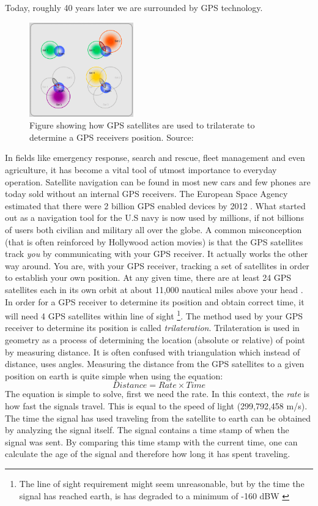 \documentclass[12pt,english,a4paper]{article}
\begin{document}
Today, roughly 40 years later we are surrounded by GPS technology.
\begin{figure}
  \centering
  \includegraphics[width=0.40\textwidth]{trilaterate.jpg}
  \caption[GPS trilaterate figure]
   {Figure showing how GPS satellites are used to trilaterate to determine a GPS receivers position. Source: \cite{GISTRILATERATE}}
\end{figure}
In fields like emergency response, search and rescue, fleet management and even agriculture, it has become a vital tool of utmost importance to everyday operation. Satellite navigation can be found in most new cars and few phones are today sold without an internal GPS receivers. The European Space Agency estimated that there were 2 billion GPS enabled devices by 2012 \cite{ESA}. What started out as a navigation tool for the U.S navy is now used by millions, if not billions of users both civilian and military all over the globe. A common misconception (that is often reinforced by Hollywood action movies) is that the GPS satellites track \textit{you} by communicating with your GPS receiver. It actually works the other way around. You are, with your GPS receiver, tracking a set of satellites in order to establish your own position. At any given time, there are at least 24 GPS satellites each in its own orbit at about 11,000 nautical miles above your head \cite{GPSGOVSS}. In order for a GPS receiver to determine its position and obtain correct time, it will need 4 GPS satellites within line of sight \footnote{The line of sight requirement might seem unreasonable, but by the time the signal has reached earth, is has degraded to a minimum of -160 dBW \cite{NATINT}}.
The method used by your GPS receiver to determine its position is called \textit{trilateration}. 
Trilateration is used in geometry as a process of determining the location (absolute or relative) of point by measuring distance. It is often confused with triangulation which instead of distance, uses angles. Measuring the distance from the GPS satellites to a given position on earth is quite simple when using the equation: 
\begin{equation} Distance = Rate \times Time \end{equation} 
The equation is simple to solve, first we need the rate. In this context, the \textit{rate} is how fast the signals travel. This is equal to the speed of light (299,792,458 m/s). The time the signal has used traveling from the satellite to earth can be obtained by analyzing the signal itself. The signal contains a time stamp of when the signal was sent. By comparing this time stamp with the current time, one can calculate the age of the signal and therefore how long it has spent traveling. \cite{GPSGOVTE}  
\end{document}
